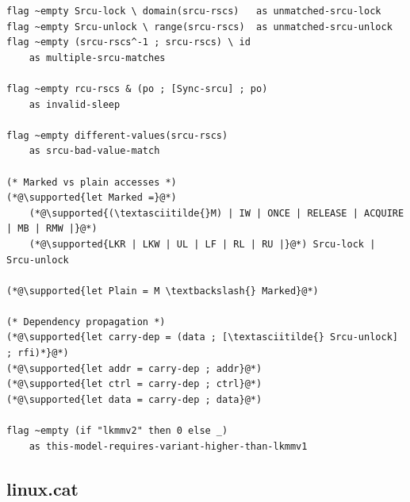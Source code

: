\begin{lstlisting}
flag ~empty Srcu-lock \ domain(srcu-rscs)   as unmatched-srcu-lock
flag ~empty Srcu-unlock \ range(srcu-rscs)  as unmatched-srcu-unlock
flag ~empty (srcu-rscs^-1 ; srcu-rscs) \ id
    as multiple-srcu-matches

flag ~empty rcu-rscs & (po ; [Sync-srcu] ; po)
    as invalid-sleep

flag ~empty different-values(srcu-rscs)
    as srcu-bad-value-match

(* Marked vs plain accesses *)
(*@\supported{let Marked =}@*)
    (*@\supported{(\textasciitilde{}M) | IW | ONCE | RELEASE | ACQUIRE | MB | RMW |}@*)
    (*@\supported{LKR | LKW | UL | LF | RL | RU |}@*) Srcu-lock | Srcu-unlock

(*@\supported{let Plain = M \textbackslash{} Marked}@*)

(* Dependency propagation *)
(*@\supported{let carry-dep = (data ; [\textasciitilde{} Srcu-unlock] ; rfi)*}@*)
(*@\supported{let addr = carry-dep ; addr}@*)
(*@\supported{let ctrl = carry-dep ; ctrl}@*)
(*@\supported{let data = carry-dep ; data}@*)

flag ~empty (if "lkmmv2" then 0 else _)
    as this-model-requires-variant-higher-than-lkmmv1
\end{lstlisting}

\subsection{linux.cat}
\label{app:lkmm-cat}

